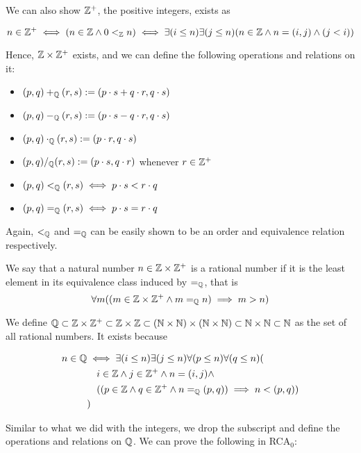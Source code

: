 \documentclass[../main.tex]{memoir}
\begin{document}
We can also show $\mathbb{Z}^+$, the positive integers, exists as

\[
  n \in \mathbb{Z}^+ \iff (n \in \mathbb{Z} \land 0 <_{\mathbb{Z}} n) \iff \exists (i \le n) \exists (j \le n) (n \in \mathbb{Z} \land n = (i, j) \land (j < i))
\]

Hence, $\mathbb{Z} \times \mathbb{Z}^+$ exists, and we can define the following operations and relations on it:

\begin{itemize}
\item $(p, q) +_{\mathbb{Q}} (r, s) := (p \cdot s + q \cdot r, q \cdot s)$
\item $(p, q) -_{\mathbb{Q}} (r, s) := (p \cdot s - q \cdot r, q \cdot s)$
\item $(p, q) \cdot_{\mathbb{Q}} (r, s) := (p \cdot r, q \cdot s)$
\item $(p, q) /_{\mathbb{Q}} (r, s) := (p \cdot s, q \cdot r)$ whenever $r \in \mathbb{Z}^+$
\item $(p, q) <_{\mathbb{Q}} (r, s) \iff p \cdot s < r \cdot q$
\item $(p, q) =_{\mathbb{Q}} (r, s) \iff p \cdot s = r \cdot q$
\end{itemize}

Again, $<_{\mathbb{Q}}$ and $=_{\mathbb{Q}}$ can be easily shown to be an order and equivalence relation respectively.

\begin{definition}
  We say that a natural number $n \in \mathbb{Z} \times \mathbb{Z}^+$ is a rational number if it is the least element in its equivalence class induced by $=_{\mathbb{Q}}$, that is
  \[
    \forall m ((m \in \mathbb{Z} \times \mathbb{Z}^+ \land m =_{\mathbb{Q}} n) \implies m > n)
  \]
\end{definition}

We define $\mathbb{Q} \subset \mathbb{Z} \times \mathbb{Z}^+ \subset \mathbb{Z} \times \mathbb{Z} \subset (\mathbb{N} \times \mathbb{N}) \times (\mathbb{N} \times \mathbb{N}) \subset \mathbb{N} \times \mathbb{N} \subset \mathbb{N}$ as the set of all rational numbers. It exists because

\begin{align*}
  n \in \mathbb{Q} & \iff \exists (i \le n) \exists (j \le n) \forall (p \le n) \forall (q \le n) ( \\
           & \quad i \in \mathbb{Z} \land j \in \mathbb{Z}^+ \land n = (i, j) \land \\
           & \quad ((p \in \mathbb{Z} \land q \in \mathbb{Z}^+ \land n =_{\mathbb{Q}} (p, q)) \implies n < (p, q)) \\
           & )
\end{align*}

 Similar to what we did with the integers, we drop the subscript and define the operations and relations on $\mathbb{Q}$. We can prove the following in RCA$_0$:
\end{document}
